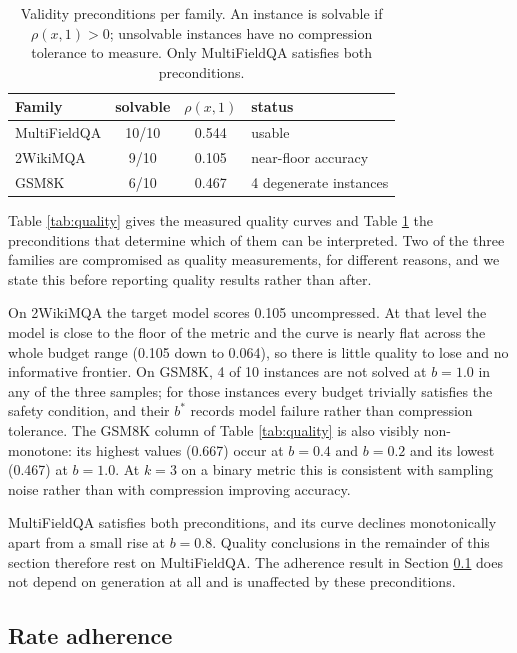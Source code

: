 \documentclass[conference]{IEEEtran}
\begin{document}
\begin{table}[t]
\caption{Validity preconditions per family. An instance is solvable if
$\rho(x,1) > 0$; unsolvable instances have no compression tolerance to
measure. Only MultiFieldQA satisfies both preconditions.}
\label{tab:validity}
\centering
\small
\begin{tabular}{lccl}
\toprule
Family & solvable & $\rho(x,1)$ & status \\
\midrule
MultiFieldQA & 10/10 & 0.544 & usable \\
2WikiMQA & 9/10 & 0.105 & near-floor accuracy \\
GSM8K & 6/10 & 0.467 & 4 degenerate instances \\
\bottomrule
\end{tabular}
\end{table}

Table \ref{tab:quality} gives the measured quality curves and Table
\ref{tab:validity} the preconditions that determine which of them can be
interpreted. Two of the three families are compromised as quality
measurements, for different reasons, and we state this before reporting
quality results rather than after.

On 2WikiMQA the target model scores 0.105 uncompressed. At that level the
model is close to the floor of the metric and the curve is nearly flat across
the whole budget range (0.105 down to 0.064), so there is little quality to
lose and no informative frontier. On GSM8K, 4 of 10 instances are not solved
at $b=1.0$ in any of the three samples; for those instances every budget
trivially satisfies the safety condition, and their $b^{*}$ records model
failure rather than compression tolerance. The GSM8K column of Table
\ref{tab:quality} is also visibly non-monotone: its highest values (0.667)
occur at $b=0.4$ and $b=0.2$ and its lowest (0.467) at $b=1.0$. At $k=3$ on a
binary metric this is consistent with sampling noise rather than with
compression improving accuracy.

MultiFieldQA satisfies both preconditions, and its curve declines
monotonically apart from a small rise at $b=0.8$. Quality conclusions in the
remainder of this section therefore rest on MultiFieldQA. The adherence
result in Section \ref{sec:adh} does not depend on generation at all and is
unaffected by these preconditions.

\subsection{Rate adherence}
\label{sec:adh}
\end{document}
